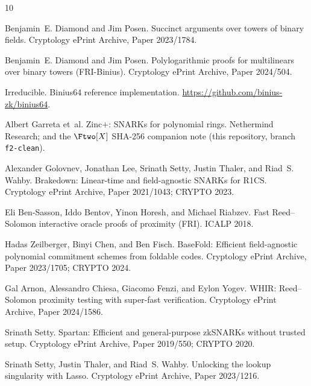 \begin{thebibliography}{10}

Benjamin~E. Diamond and Jim Posen.
\newblock Succinct arguments over towers of binary fields.
\newblock Cryptology ePrint Archive, Paper 2023/1784.

Benjamin~E. Diamond and Jim Posen.
\newblock Polylogarithmic proofs for multilinears over binary towers
  (FRI-Binius).
\newblock Cryptology ePrint Archive, Paper 2024/504.

Irreducible.
\newblock Binius64 reference implementation.
\newblock \url{https://github.com/binius-zk/binius64}.

Albert Garreta et~al.
\newblock Zinc$+$: SNARKs for polynomial rings.
\newblock Nethermind Research; and the $\Ftwo[X]$ SHA-256 companion note
  (this repository, branch \texttt{f2-clean}).

Alexander Golovnev, Jonathan Lee, Srinath Setty, Justin Thaler, and
  Riad~S. Wahby.
\newblock Brakedown: Linear-time and field-agnostic SNARKs for R1CS.
\newblock Cryptology ePrint Archive, Paper 2021/1043; CRYPTO 2023.

Eli Ben-Sasson, Iddo Bentov, Yinon Horesh, and Michael Riabzev.
\newblock Fast Reed--Solomon interactive oracle proofs of proximity (FRI).
\newblock ICALP 2018.

Hadas Zeilberger, Binyi Chen, and Ben Fisch.
\newblock BaseFold: Efficient field-agnostic polynomial commitment schemes
  from foldable codes.
\newblock Cryptology ePrint Archive, Paper 2023/1705; CRYPTO 2024.

Gal Arnon, Alessandro Chiesa, Giacomo Fenzi, and Eylon Yogev.
\newblock WHIR: Reed--Solomon proximity testing with super-fast
  verification.
\newblock Cryptology ePrint Archive, Paper 2024/1586.

Srinath Setty.
\newblock Spartan: Efficient and general-purpose zkSNARKs without trusted
  setup.
\newblock Cryptology ePrint Archive, Paper 2019/550; CRYPTO 2020.

Srinath Setty, Justin Thaler, and Riad~S. Wahby.
\newblock Unlocking the lookup singularity with Lasso.
\newblock Cryptology ePrint Archive, Paper 2023/1216.

\end{thebibliography}
